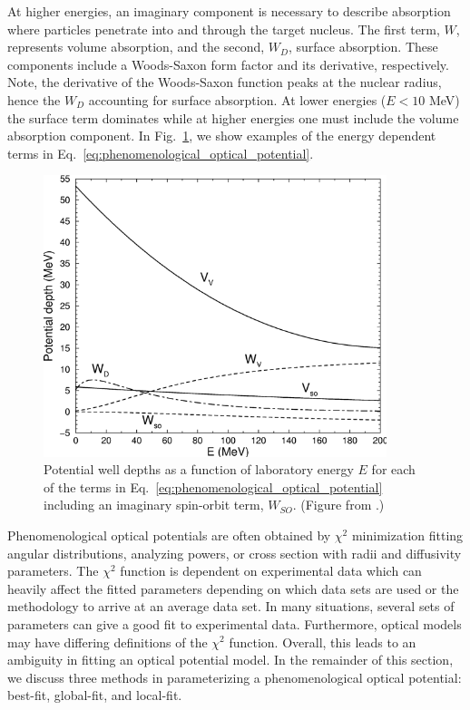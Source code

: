 \documentclass[preprintnumbers,floatfix,aps,prc,preprint,nofootinbib]{revtex4-1}
\begin{document}
At higher energies, an imaginary component is necessary to describe absorption where particles penetrate into and through the target nucleus. The first term, $W$, represents volume absorption, and the second, $W_D$, surface absorption. These components include a Woods-Saxon form factor and its derivative, respectively. Note, the derivative of the Woods-Saxon function peaks at the nuclear radius, hence the $W_D$ accounting for surface absorption. At lower energies ($E < 10$ MeV) the surface term dominates while at higher energies one must include the volume absorption component. In Fig.~\ref{fig:potential_wells_omp}, we show examples of the energy dependent terms in Eq.~\ref{eq:phenomenological_optical_potential}.
\\

%
\begin{figure}
	\captionsetup{singlelinecheck=false,justification=raggedright}
	\centering
	\includegraphics[width=10cm]{potential_wells_omp}
	\caption{Potential well depths as a function of laboratory energy $E$ for each of the terms in Eq.~\ref{eq:phenomenological_optical_potential} including an imaginary spin-orbit term, $W_{SO}$. (Figure from \cite{Koning:2003zz}.)}
	\label{fig:potential_wells_omp}
\end{figure}
%

Phenomenological optical potentials are often obtained by $\chi^2$ minimization fitting angular distributions, analyzing powers, or cross section with radii and diffusivity parameters. The $\chi^2$ function is dependent on experimental data which can heavily affect the fitted parameters depending on which data sets are used or the methodology to arrive at an average data set. In many situations, several sets of parameters can give a good fit to experimental data. Furthermore, optical models may have differing definitions of the $\chi^2$ function. Overall, this leads to an ambiguity in fitting an optical potential model. In the remainder of this section, we discuss three methods in parameterizing a phenomenological optical potential: best-fit, global-fit, and local-fit.
\\
\end{document}
